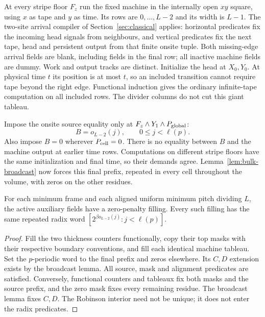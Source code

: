 At every stripe floor $F_z$ run the fixed machine in the internally
open $xy$ square, using $x$ as tape and $y$ as time. Its rows are
$0,\ldots,L-2$ and its width is $L-1$. The two-site arrival compiler
of Section~\ref{sec:classical} applies: horizontal predicates fix
the incoming head signals from neighbours, and vertical predicates
fix the next tape, head and persistent output from that finite onsite
tuple. Both missing-edge arrival fields are blank, including fields
in the final row; all inactive machine fields are dummy. Work and
output tracks are distinct. Initialize the head at $X_0,Y_0$.
At physical time $t$ its position is at most $t$, so an included
transition cannot require tape beyond the right edge. Functional
induction gives the ordinary infinite-tape computation on all
included rows. The divider columns do not cut this giant tableau.

Impose the onsite source equality only at
$F_z\wedge Y_1\wedge P_{\rm global}$:
\begin{equation}\label{eq:bulk-final-source}
 B=o_{L-2}(j),\qquad 0\leq j<\ell(p).
\end{equation}
Also impose $B=0$ wherever $P_{\rm cell}=0$. There is no equality
between $B$ and the machine output at earlier time rows. Computations
on different stripe floors have the same initialization and final
time, so their demands agree. Lemma~\ref{lem:bulk-broadcast} now
forces this final prefix, repeated in every cell throughout the
volume, with zeros on the other residues.

\begin{lemma}\label{lem:bulk-completion}
For each minimum frame and each aligned uniform minimum pitch dividing
$L$, the active auxiliary fields have a zero-penalty filling. Every
such filling has the same repeated radix word
$[2^{\beta o_{L-2}(j)}:j<\ell(p)]$.
\end{lemma}
\begin{proof}
Fill the two thickness counters functionally, copy their top masks
with their respective boundary conventions, and fill each identical
machine tableau. Set the $p$-periodic word to the final prefix and
zeros elsewhere. Its $C,D$ extension exists by the broadcast lemma.
All source, mask and alignment predicates are satisfied. Conversely,
functional counters and tableaux fix both masks and the source
prefix, and the zero mask fixes every remaining residue. The
broadcast lemma fixes $C,D$. The Robinson interior need not be
unique; it does not enter the radix predicates.
\end{proof}

